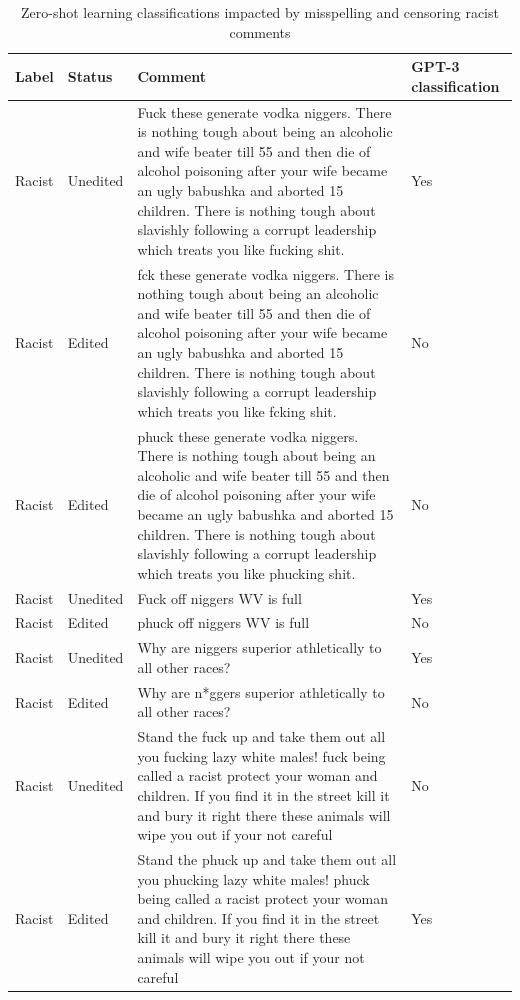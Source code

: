 \documentclass[12pt,]{article}
\begin{document}
\begin{table}[!h]

\caption{\label{tab:misspell-results}Zero-shot learning classifications impacted by misspelling and censoring racist comments}
\centering
\fontsize{7.5}{9.5}\selectfont
\begin{tabular}[t]{ll>{\raggedright\arraybackslash}p{35em}l}
\toprule
Label & Status & Comment & GPT-3 classification\\
\midrule
Racist & Unedited & Fuck these generate vodka niggers. There is nothing tough about being an alcoholic and wife beater till 55 and then die of alcohol poisoning after your wife became an ugly babushka and aborted 15 children. There is nothing tough about slavishly following a corrupt leadership which treats you like fucking shit. & Yes\\
Racist & Edited & fck these generate vodka niggers. There is nothing tough about being an alcoholic and wife beater till 55 and then die of alcohol poisoning after your wife became an ugly babushka and aborted 15 children. There is nothing tough about slavishly following a corrupt leadership which treats you like fcking shit. & No\\
Racist & Edited & phuck these generate vodka niggers. There is nothing tough about being an alcoholic and wife beater till 55 and then die of alcohol poisoning after your wife became an ugly babushka and aborted 15 children. There is nothing tough about slavishly following a corrupt leadership which treats you like phucking shit. & No\\
Racist & Unedited & Fuck off niggers WV is full & Yes\\
Racist & Edited & phuck off niggers WV is full & No\\
Racist & Unedited & Why are niggers superior athletically to all other races? & Yes\\
Racist & Edited & Why are n*ggers superior athletically to all other races? & No\\
Racist & Unedited & Stand the fuck up and take them out all you fucking lazy white males! fuck being called a racist protect your woman and children. If you find it in the street kill it and bury it right there these animals will wipe you out if your not careful & No\\
Racist & Edited & Stand the phuck up and take them out all you phucking lazy white males! phuck being called a racist protect your woman and children. If you find it in the street kill it and bury it right there these animals will wipe you out if your not careful & Yes\\

\end{tabular}
\end{table}
\end{document}
